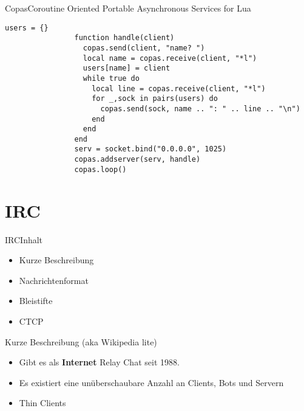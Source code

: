 \documentclass{beamer}
\begin{document}
		\begin{frame}[fragile,shrink=5]{Copas}{Coroutine Oriented Portable Asynchronous Services for Lua}
			\lstset{numbers=left}

			\begin{lstlisting}[title={Primitiver Chatserver},firstnumber=3,frame=single]
				users = {}
				function handle(client)
				  copas.send(client, "name? ")
				  local name = copas.receive(client, "*l")
				  users[name] = client
				  while true do
				    local line = copas.receive(client, "*l")
				    for _,sock in pairs(users) do
				      copas.send(sock, name .. ": " .. line .. "\n")
				    end
				  end
				end
				serv = socket.bind("0.0.0.0", 1025)
				copas.addserver(serv, handle)
				copas.loop()
			\end{lstlisting}
		\end{frame}
	
	
	\section{IRC}
		\begin{frame}{IRC}{Inhalt}
			\begin{itemize}
				\item Kurze Beschreibung 
				\item Nachrichtenformat
				\item Bleistifte
				\item CTCP
			\end{itemize}
		\end{frame}
		
		\begin{frame}{Kurze Beschreibung (aka Wikipedia lite)}
			\begin{itemize}
				\item Gibt es als \textbf{Internet} Relay Chat seit 1988.
				\item Es existiert eine unüberschaubare Anzahl an Clients, Bots und Servern
				\item Thin Clients
			\end{itemize}
		\end{frame}
		
\end{document}
